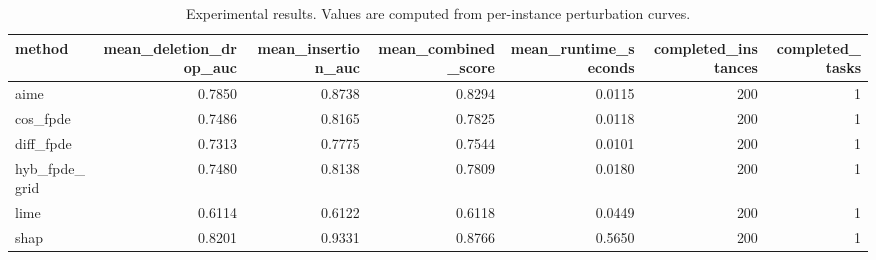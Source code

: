 \begin{table}[t]
\caption{Experimental results. Values are computed from per-instance perturbation curves.}
\label{tab:main_results_computed}
\centering
\begin{tabular}{lrrrrrr}
\toprule
method & mean\_deletion\_drop\_auc & mean\_insertion\_auc & mean\_combined\_score & mean\_runtime\_seconds & completed\_instances & completed\_tasks \\
\midrule
aime & 0.7850 & 0.8738 & 0.8294 & 0.0115 & 200 & 1 \\
cos\_fpde & 0.7486 & 0.8165 & 0.7825 & 0.0118 & 200 & 1 \\
diff\_fpde & 0.7313 & 0.7775 & 0.7544 & 0.0101 & 200 & 1 \\
hyb\_fpde\_grid & 0.7480 & 0.8138 & 0.7809 & 0.0180 & 200 & 1 \\
lime & 0.6114 & 0.6122 & 0.6118 & 0.0449 & 200 & 1 \\
shap & 0.8201 & 0.9331 & 0.8766 & 0.5650 & 200 & 1 \\
\bottomrule
\end{tabular}

\end{table}

